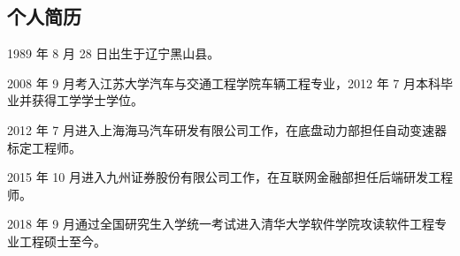 
\begin{resume}

  \section*{个人简历}

  1989 年 8 月 28 日出生于辽宁黑山县。

  2008 年 9 月考入江苏大学汽车与交通工程学院车辆工程专业，2012 年 7 月本科毕业并获得工学学士学位。

  2012 年 7 月进入上海海马汽车研发有限公司工作，在底盘动力部担任自动变速器标定工程师。

  2015 年 10 月进入九州证券股份有限公司工作，在互联网金融部担任后端研发工程师。

  2018 年 9 月通过全国研究生入学统一考试进入清华大学软件学院攻读软件工程专业工程硕士至今。








\end{resume}
